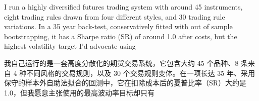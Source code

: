 
\begin{englishblock} I run a highly diversified futures trading system with around 45 instruments, eight trading rules drawn from four different styles, and 30 trading rule variations. In a 35 year back-test, conservatively fitted with out of sample bootstrapping, it has a Sharpe ratio (SR) of around 1.0 after costs, but the highest volatility target I'd advocate using \end{englishblock}

\begin{chineseblock}我自己运行的是一套高度分散化的期货交易系统，它包含大约 45 个品种、8 条来自 4 种不同风格的交易规则，以及 30 个交易规则变体。在一项长达 35 年、采用保守的样本外自助法拟合的回测中，它在扣除成本后的夏普比率（SR）大约是 1.0，但我愿意主张使用的最高波动率目标却只有\end{chineseblock}

\bipairgap

